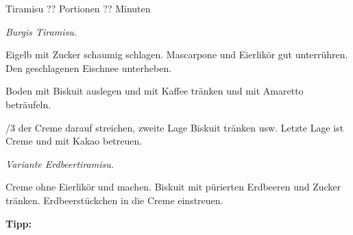 \begin{recipe}{Tiramisu} {?? Portionen} {?? Minuten}

  \freeform
  \textit{Burgis Tiramisu.}


  Eigelb mit Zucker schaumig schlagen.
  Mascarpone und Eierlikör gut unterrühren.
  Den geschlagenen Eischnee unterheben.

  \newstep
  Boden mit Biskuit auslegen und mit Kaffee tränken und mit Amaretto beträufeln.

  /3 der Creme darauf streichen, zweite Lage Biskuit tränken usw.
  Letzte Lage ist Creme und mit Kakao betreuen.


  \freeform
  \hrulefill

  \freeform
  \textit{Variante Erdbeertiramisu.}


  Creme ohne Eierlikör und machen.
  Biskuit mit pürierten Erdbeeren und Zucker tränken.
  Erdbeerstückchen in die Creme einstreuen.

  \freeform
  \hrulefill

  \freeform
  \textbf{Tipp:}

  \end{recipe}
